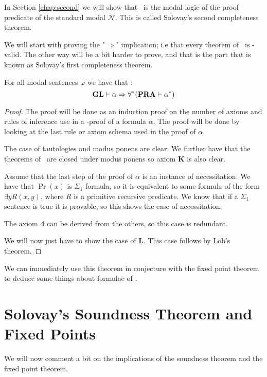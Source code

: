 \documentclass[../main.tex]{subfiles}
\begin{document}
In Section \ref{chap:second} we will show that \GLS\ is the modal logic of the proof
predicate of the standard modal $\mathcal{N}$. This is called Solovay's second completeness theorem.

We will start with proving the "$\Rightarrow$" implication; i.e that every
theorem of \GL\ is \PRA-valid. The other way will be a bit harder to prove, and
that is the part that is known as Solovay's first completeness theorem.
\begin{thm}[Soundness]
	For all modal sentences $\varphi$ we have that :
	$$\text{\textbf{GL}}\vdash\alpha\Rightarrow\forall ^*(\text{\textbf{PRA}}\vdash\alpha^*)$$
\end{thm}
\begin{proof}
	The proof will be done as an induction proof on the number of axioms
	and rules of inference use in a \GL-proof of a formula $\alpha$. The
	proof will be done by looking at the last rule or axiom schema used in
	the proof of $\alpha$.

	The case of tautologies and modus ponens are clear. We further have that the theorems of
	\PRA\ are closed under modus ponens so axiom \textbf{K} is also clear. 

	Assume that  the last step of the proof of $\alpha$ is an instance of
	necessitation. We have that $\Pr(x)$ is $\Sigma_1$ formula, so it is equivalent to
	some formula of the form $\exists y R(x,y)$, where $R$ is a primitive
	recursive predicate. We know that if a $\Sigma_1$ sentence is true it
	is provable, so this shows the case of necessitation.

	The axiom \textbf{4} can be derived from the others, so this case is redundant.

	We will now just have to show the case of \textbf{L}. This case follows by
	Löb's theorem.
\end{proof}
We can immediately use this theorem in conjecture with the fixed point theorem
to deduce some things about formulae of \PRA.
\section{Solovay's Soundness Theorem and Fixed Points}

We will now comment a bit on the implications of the soundness theorem and
the fixed point theorem.
\end{document}
